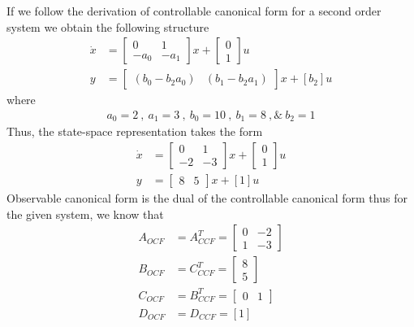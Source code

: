 \documentclass[twoside]{article}
\begin{document}
If we follow the derivation of controllable canonical form for a
second order system we obtain the following structure
%
\begin{align*}
	\dot{x} &= \left[ \begin{array}{cc} 0 & 1  \\  -a_0 & -a_1 \end{array} \right] x 
	+ \left[ \begin{array}{c} 0 \\ 1 \end{array} \right] u
	\\
	y &= \left[ \begin{array}{ccc} ( b_0 - b_2 a_0 ) & ( b_1 - b_2
                                                           a_1 )  \end{array} \right] x
	+ \left[ b_2 \right] u
\end{align*}
%
where 
%
\begin{align*}
a_0= 2 \ , \ a_1 = 3 \ , \ b_0 = 10 \ , \ b_1 = 8 \ ,\& \ b_2 = 1
\end{align*}
%
Thus, the state-space representation takes the form
%
\begin{align*}
	\dot{x} &= \left[ \begin{array}{cc} 0 & 1  \\  -2 & -3 \end{array} \right] x 
	+ \left[ \begin{array}{c} 0 \\ 1 \end{array} \right] u
	\\
	y &= \left[ \begin{array}{ccc} 8 & 5  \end{array} \right] x + [1] u
\end{align*}
%
Observable canonical form is the dual of the controllable canonical form
thus for the given system, we know that
%
\begin{align*}
	A_{OCF} &= A_{CCF}^T = \left[ \begin{array}{cc} 0 & -2  \\  1 & -3 \end{array} \right]
		\\
	B_{OCF} &= C_{CCF}^T = \left[ \begin{array}{c} 8  \\  5 \end{array} \right]
		\\
	C_{OCF} &= B_{CCF}^T = \left[ \begin{array}{cc} 0  &  1 \end{array} \right]
	\\
	 D_{OCF} &= D_{CCF} = [1]
\end{align*}
\end{document}

